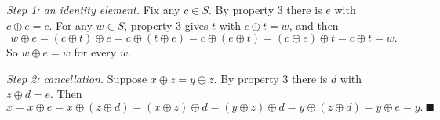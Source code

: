 \emph{Step 1: an identity element.} Fix any $c\in S$. By property 3 there is $e$ with $c\oplus e=c$. For any $w\in S$, property 3 gives $t$ with $c\oplus t=w$, and then
\[w\oplus e=(c\oplus t)\oplus e=c\oplus(t\oplus e)=c\oplus(e\oplus t)=(c\oplus e)\oplus t=c\oplus t=w.\]
So $w\oplus e=w$ for every $w$.

\emph{Step 2: cancellation.} Suppose $x\oplus z=y\oplus z$. By property 3 there is $d$ with $z\oplus d=e$. Then
\[x=x\oplus e=x\oplus(z\oplus d)=(x\oplus z)\oplus d=(y\oplus z)\oplus d=y\oplus(z\oplus d)=y\oplus e=y.\ \blacksquare\]
